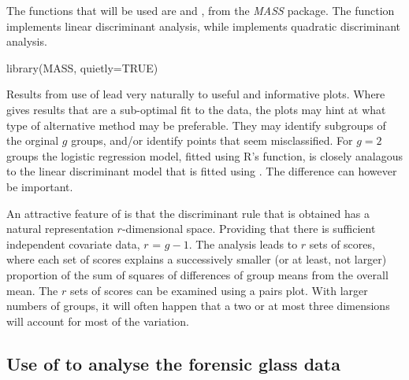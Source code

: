 The functions that will be used are 
and , from the \textit{MASS} package.  The function
 implements linear discriminant analysis, while
 implements quadratic discriminant analysis.

\begin{Schunk}
\begin{Sinput}
library(MASS, quietly=TRUE)
\end{Sinput}
\end{Schunk}

Results from use of  lead very
  naturally to useful and informative plots.  Where 
  gives results that are a sub-optimal fit to the data,
  the plots may hint at what type of alternative method
  may be preferable.  They may identify subgroups of
  the orginal $g$ groups, and/or identify points that seem
  misclassified.   For $g = 2$ groups the logistic
regression model, fitted using R's  function, is closely
analagous to the linear discriminant model that is fitted using
.  The difference can however be important.

An attractive feature of  is that the discriminant rule
that is obtained has a natural representation $r$-dimensional space.
Providing that there is sufficient independent covariate data, $r$ =
$g-1$.  The analysis leads  to $r$ sets of scores, where
each set of scores explains a successively smaller (or at least, not
larger) proportion of the sum of squares of differences of group means
from the overall mean.
The $r$ sets of scores can be examined using a
pairs plot.  With larger numbers of groups, it will often happen that
a two or at most three dimensions will account for most of the
variation.

\subsection*{Use of  to analyse the forensic glass data}

